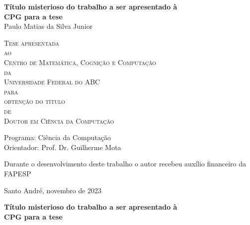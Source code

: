 \documentclass[12pt,a4paper]{book}
\begin{document}
 
\frontmatter 
\fancyhead[RO]{{\footnotesize\rightmark}\hspace{2em}\thepage}
\setcounter{tocdepth}{2}
\setcounter{secnumdepth}{3}
\fancyhead[LE]{\thepage\hspace{2em}\footnotesize{\leftmark}}
\fancyhead[RE,LO]{}
\fancyhead[RO]{{\footnotesize\rightmark}\hspace{2em}\thepage}

\doublespacing %

\thispagestyle{empty}
\begin{center}
    \vspace*{2.3cm}
    \textbf{\Large{Título misterioso do trabalho a ser apresentado à \\
    CPG para a tese}}\\
    
    \vspace*{1.2cm}
    \Large{Paulo Matias da Silva Junior}
    
    \vskip 2cm
    \textsc{
    Tese apresentada\\[-0.25cm] 
    ao\\[-0.25cm]
    Centro de Matemática, Cognição e Computação\\[-0.25cm]
    da\\[-0.25cm]
    Universidade Federal do ABC\\[-0.25cm]
    para\\[-0.25cm]
    obtenção do título\\[-0.25cm]
    de\\[-0.25cm]
    Doutor em Ciência da Computação}
    
    \vskip 1.5cm
    Programa: Ciência da Computação\\
    Orientador: Prof. Dr. Guilherme Mota

   	\vskip 1cm
    \normalsize{Durante o desenvolvimento deste trabalho o autor recebeu auxílio
    financeiro da FAPESP}
    
    \vskip 0.5cm
    \normalsize{Santo André, novembro de 2023}
\end{center}


%
%
%
\newpage
\thispagestyle{empty}
    \begin{center}
        \vspace*{2.3 cm}
        \textbf{\Large{Título misterioso do trabalho a ser apresentado à \\
        CPG para a tese}}\\
        \vspace*{2 cm}
    \end{center}
\end{document}
